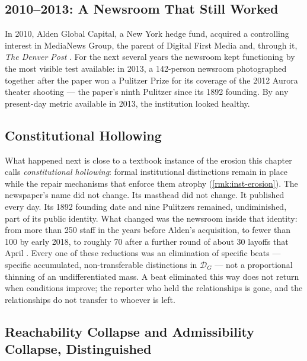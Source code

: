 \documentclass[12pt,twoside,openright]{book}
\begin{document}
\subsection{2010--2013: A Newsroom That Still Worked}

In 2010, Alden Global Capital, a New York hedge fund, acquired a
controlling interest in MediaNews Group, the parent of Digital
First Media and, through it, \emph{The Denver Post}
\parencite{npr2018denverpost}. For the next several years the
newsroom kept functioning by the most visible test available: in
2013, a 142-person newsroom photographed together after the
paper won a Pulitzer Prize for its coverage of the 2012 Aurora
theater shooting --- the paper's ninth Pulitzer since its 1892
founding. By any present-day metric available in 2013, the
institution looked healthy.

\subsection{Constitutional Hollowing}

What happened next is close to a textbook instance of the
erosion this chapter calls \emph{constitutional hollowing}: formal
institutional distinctions remain in place while the repair
mechanisms that enforce them atrophy (\cref{rmk:inst-erosion}).
The newspaper's name did not change. Its masthead did not
change. It published every day. Its 1892 founding date and nine
Pulitzers remained, undiminished, part of its public identity.
What changed was the newsroom inside that identity: from more
than 250 staff in the years before Alden's acquisition, to fewer
than 100 by early 2018, to roughly 70 after a further round of
about 30 layoffs that April \parencite{npr2018denverpost}. Every
one of these reductions was an elimination of specific beats ---
specific accumulated, non-transferable distinctions in
$\mathcal{D}_G$ --- not a proportional thinning of an undifferentiated
mass. A beat eliminated this way does not return when conditions
improve; the reporter who held the relationships is gone, and
the relationships do not transfer to whoever is left.

\subsection{Reachability Collapse and Admissibility Collapse,
Distinguished}
\end{document}

